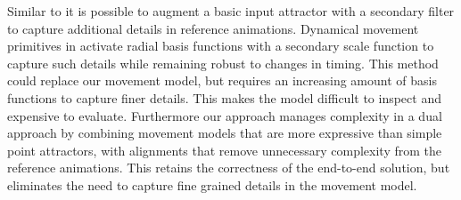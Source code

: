 Similar to \citep{startke20} it is possible to augment a basic input attractor with a secondary filter to capture additional details in reference animations. Dynamical movement primitives in \citep{schaal06,Ijspeert12} activate radial basis functions with a secondary scale function to capture such details while remaining robust to changes in timing. This method could replace our movement model, but requires an increasing amount of basis functions to capture finer details. This makes the model difficult to inspect and expensive to evaluate. Furthermore our approach manages complexity in a dual approach by combining movement models that are more expressive than simple point attractors, with alignments that remove unnecessary complexity from the reference animations. This retains the correctness of the end-to-end solution, but eliminates the need to capture fine grained details in the movement model.




